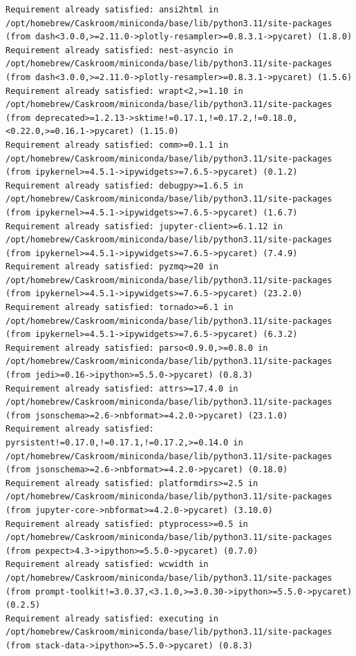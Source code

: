 \documentclass[
  letterpaper,
  DIV=11,
  numbers=noendperiod]{scrartcl}
\begin{document}
\begin{verbatim}
Requirement already satisfied: ansi2html in /opt/homebrew/Caskroom/miniconda/base/lib/python3.11/site-packages (from dash<3.0.0,>=2.11.0->plotly-resampler>=0.8.3.1->pycaret) (1.8.0)
Requirement already satisfied: nest-asyncio in /opt/homebrew/Caskroom/miniconda/base/lib/python3.11/site-packages (from dash<3.0.0,>=2.11.0->plotly-resampler>=0.8.3.1->pycaret) (1.5.6)
Requirement already satisfied: wrapt<2,>=1.10 in /opt/homebrew/Caskroom/miniconda/base/lib/python3.11/site-packages (from deprecated>=1.2.13->sktime!=0.17.1,!=0.17.2,!=0.18.0,<0.22.0,>=0.16.1->pycaret) (1.15.0)
Requirement already satisfied: comm>=0.1.1 in /opt/homebrew/Caskroom/miniconda/base/lib/python3.11/site-packages (from ipykernel>=4.5.1->ipywidgets>=7.6.5->pycaret) (0.1.2)
Requirement already satisfied: debugpy>=1.6.5 in /opt/homebrew/Caskroom/miniconda/base/lib/python3.11/site-packages (from ipykernel>=4.5.1->ipywidgets>=7.6.5->pycaret) (1.6.7)
Requirement already satisfied: jupyter-client>=6.1.12 in /opt/homebrew/Caskroom/miniconda/base/lib/python3.11/site-packages (from ipykernel>=4.5.1->ipywidgets>=7.6.5->pycaret) (7.4.9)
Requirement already satisfied: pyzmq>=20 in /opt/homebrew/Caskroom/miniconda/base/lib/python3.11/site-packages (from ipykernel>=4.5.1->ipywidgets>=7.6.5->pycaret) (23.2.0)
Requirement already satisfied: tornado>=6.1 in /opt/homebrew/Caskroom/miniconda/base/lib/python3.11/site-packages (from ipykernel>=4.5.1->ipywidgets>=7.6.5->pycaret) (6.3.2)
Requirement already satisfied: parso<0.9.0,>=0.8.0 in /opt/homebrew/Caskroom/miniconda/base/lib/python3.11/site-packages (from jedi>=0.16->ipython>=5.5.0->pycaret) (0.8.3)
Requirement already satisfied: attrs>=17.4.0 in /opt/homebrew/Caskroom/miniconda/base/lib/python3.11/site-packages (from jsonschema>=2.6->nbformat>=4.2.0->pycaret) (23.1.0)
Requirement already satisfied: pyrsistent!=0.17.0,!=0.17.1,!=0.17.2,>=0.14.0 in /opt/homebrew/Caskroom/miniconda/base/lib/python3.11/site-packages (from jsonschema>=2.6->nbformat>=4.2.0->pycaret) (0.18.0)
Requirement already satisfied: platformdirs>=2.5 in /opt/homebrew/Caskroom/miniconda/base/lib/python3.11/site-packages (from jupyter-core->nbformat>=4.2.0->pycaret) (3.10.0)
Requirement already satisfied: ptyprocess>=0.5 in /opt/homebrew/Caskroom/miniconda/base/lib/python3.11/site-packages (from pexpect>4.3->ipython>=5.5.0->pycaret) (0.7.0)
Requirement already satisfied: wcwidth in /opt/homebrew/Caskroom/miniconda/base/lib/python3.11/site-packages (from prompt-toolkit!=3.0.37,<3.1.0,>=3.0.30->ipython>=5.5.0->pycaret) (0.2.5)
Requirement already satisfied: executing in /opt/homebrew/Caskroom/miniconda/base/lib/python3.11/site-packages (from stack-data->ipython>=5.5.0->pycaret) (0.8.3)

\end{verbatim}
\end{document}
